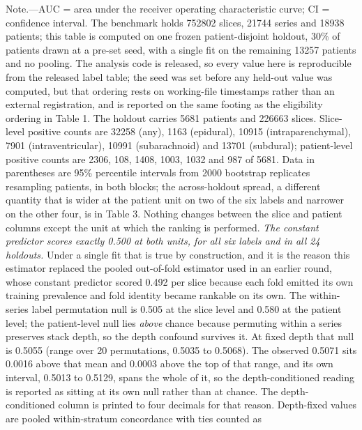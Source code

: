\documentclass[11pt,letterpaper]{article}
\begin{document}
\begin{singlespace}
\vspace{0.4em}
{\scriptsize
Note.---AUC = area under the receiver operating characteristic curve;
CI = confidence interval. The benchmark holds \num{752802} slices, \num{21744}
series and \num{18938} patients; this table is computed on one frozen
patient-disjoint holdout, 30\% of patients drawn at a pre-set seed, with a
single fit on the remaining \num{13257} patients and no pooling. The analysis
code is released, so every value here is reproducible from the released label
table; the seed was set before any held-out value was computed, but that
ordering rests on working-file timestamps rather than an external registration,
and is reported on the same footing as the eligibility ordering in Table 1. The holdout carries \num{5681} patients and
\num{226663} slices. Slice-level positive counts are \num{32258} (any),
\num{1163} (epidural), \num{10915} (intraparenchymal), \num{7901}
(intraventricular), \num{10991} (subarachnoid) and \num{13701} (subdural);
patient-level positive counts are \num{2306}, 108, \num{1408}, \num{1003},
\num{1032} and 987 of \num{5681}. Data in parentheses are 95\% percentile
intervals from 2000 bootstrap replicates resampling patients, in both blocks; the
across-holdout spread, a different quantity that is wider at the patient unit on
two of the six labels and narrower on the other four, is in Table 3.
Nothing changes between the slice and patient columns except the unit at which
the ranking is performed.
\emph{The constant predictor scores exactly 0.500 at both units, for all six
labels and in all 24 holdouts.} Under a single fit that is true by construction,
and it is the reason this estimator replaced the pooled out-of-fold estimator
used in an earlier round, whose constant predictor scored 0.492 per slice because
each fold emitted its own training prevalence and fold identity became rankable
on its own.
The within-series label permutation null is 0.505 at the slice level and 0.580 at
the patient level; the patient-level null lies \emph{above} chance because
permuting within a series preserves stack depth, so the depth confound survives
it. At fixed depth that null is 0.5055 (range over 20 permutations, 0.5035 to
0.5068). The observed 0.5071 sits 0.0016 above that mean and 0.0003 above the top
of that range, and its own interval, 0.5013 to 0.5129, spans the whole of it, so
the depth-conditioned reading is reported as sitting at its own null rather than
at chance. The depth-conditioned column is printed to
four decimals for that reason.
Depth-fixed values are pooled within-stratum concordance with ties counted as
}
\end{singlespace}
\end{document}
